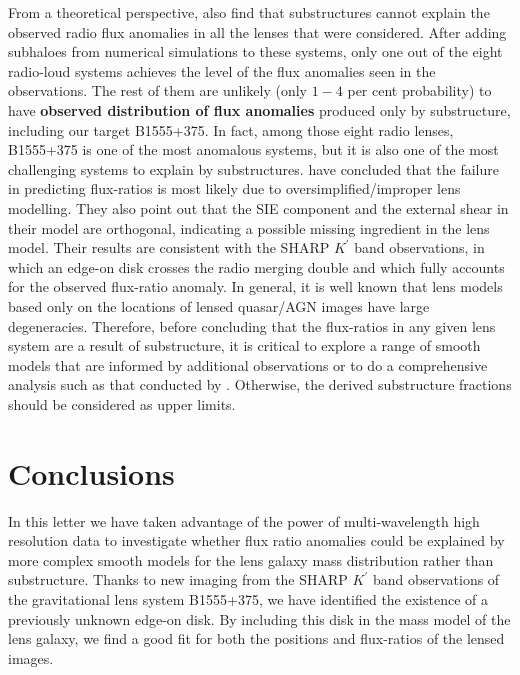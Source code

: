 \documentclass[useAMS,usenatbib]{mn2e}
\begin{document}
From a theoretical perspective, \citet{Xu14} also find that substructures
cannot explain the observed radio flux anomalies in all the lenses
that were considered. After adding subhaloes from numerical simulations
to these systems, only one out of the eight radio-loud systems
achieves the level of the flux anomalies seen in the observations.  The rest of
them are unlikely (only $1 - 4$ per cent probability) to have \textbf{observed distribution of flux
anomalies} produced only by substructure, including our target B1555+375.
In fact, among those eight radio lenses, B1555+375 is one of the most
anomalous systems, but it is also one of the most challenging systems
to explain by substructures. \citet{Xu14} have concluded that the failure in
predicting flux-ratios is most likely due to oversimplified/improper lens
modelling. They also point out that the SIE component and the external
shear in their model are orthogonal, indicating a possible missing
ingredient in the lens model. Their results are consistent with the SHARP
$K^{\prime}$ band observations, in which an edge-on disk crosses the
radio merging double and which fully accounts for the observed flux-ratio anomaly.  In general, it is well known 
\citep[e.g,][]{Ka91} that lens models based only on the locations of lensed
quasar/AGN images have large degeneracies. Therefore, before
concluding that the flux-ratios in any given lens system are a result
of substructure, it is critical to explore a range of smooth models
that are informed by additional observations or to do a comprehensive
analysis such as that conducted by \citet{Xu14}. Otherwise, the derived
substructure fractions should be considered as upper limits.
 

\section{Conclusions}
In this letter we have taken advantage of the power of
multi-wavelength high resolution data to investigate whether flux
ratio anomalies could be explained by more complex smooth models for
the lens galaxy mass distribution rather than substructure. Thanks to
new imaging from the SHARP $K^{\prime}$ band observations of the
gravitational lens system B1555+375, we have identified the existence
of a previously unknown edge-on disk. By including this disk in the
mass model of the lens galaxy, we find a good fit for both the
positions and flux-ratios of the lensed images. 
\end{document}

